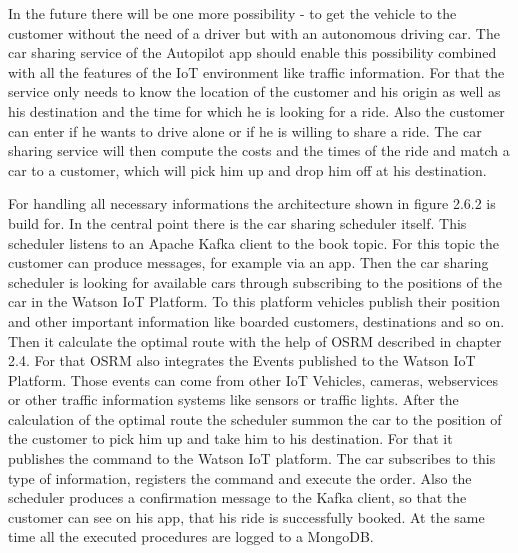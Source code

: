 In the future there will be one more possibility - to get the vehicle to the customer without the need of a driver but with an autonomous driving car. The car sharing service of the Autopilot app should enable this possibility combined with all the features of the IoT environment like traffic information. For that the service only needs to know the location of the customer and his origin as well as his destination and the time for which he is looking for a ride. Also the customer can enter if he wants to drive alone or if he is willing to share a ride. The car sharing service will then compute the costs and the times of the ride and match a car to a customer, which will pick him up and drop him off at his destination.

For handling all necessary informations the architecture shown in figure 2.6.2 is build for. In the central point there is the car sharing scheduler itself. This scheduler listens to an Apache Kafka client to the book topic. For this topic the customer can produce messages, for example via an app. Then the car sharing scheduler is looking for available cars through subscribing to the positions of the car in the Watson IoT Platform. To this platform vehicles publish their position and other important information like boarded customers, destinations and so on. Then it calculate the optimal route with the help of OSRM described in chapter 2.4. For that OSRM also integrates the Events published to the Watson IoT Platform. Those events can come from other IoT Vehicles, cameras, webservices or other traffic information systems like sensors or traffic lights. After the calculation of the optimal route the scheduler summon the car to the position of the customer to pick him up and take him to his destination. For that it publishes the command to the Watson IoT platform. The car subscribes to this type of information, registers the command and execute the order. Also the scheduler produces a confirmation message to the Kafka client, so that the customer can see on his app, that his ride is successfully booked. At the same time all the executed procedures are logged to a MongoDB.

